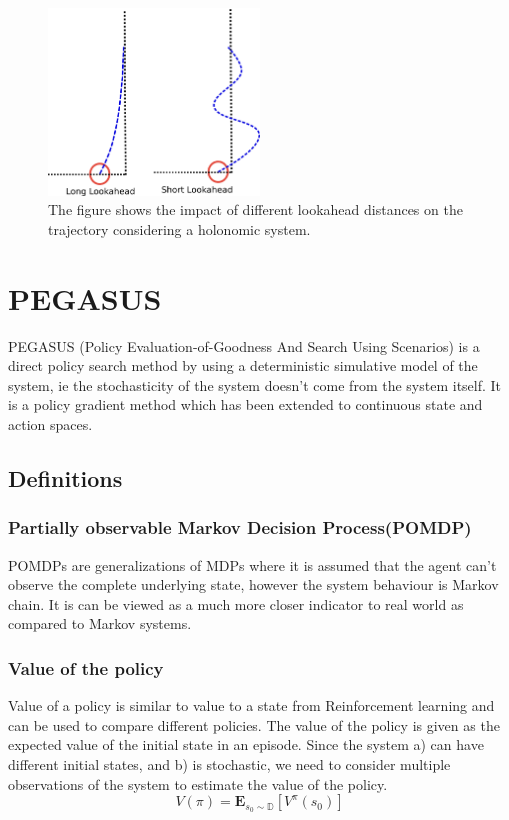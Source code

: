 \documentclass[hidelinks,BTech]{iitmdiss}
\begin{document}
\begin{figure}[H]
  \centering
    \includegraphics[width=0.5\textwidth]{Pure_Pursuit_path.png}
    \caption{The figure shows the impact of different lookahead distances on the trajectory considering a holonomic system.}
\end{figure}


\section{PEGASUS}
PEGASUS \cite{PEGASUS} (Policy Evaluation-of-Goodness And Search Using Scenarios) is a direct policy search method by using a deterministic simulative model of the system, ie the stochasticity of the system doesn't come from the system itself. It is a policy gradient method which has been extended to continuous state and action spaces.

\subsection*{Definitions}
\subsubsection{Partially observable Markov Decision Process(POMDP)}
POMDPs are generalizations of MDPs where it is assumed that the agent can't observe the complete underlying state, however the system behaviour is Markov chain. It is can be viewed as a much more closer indicator to real world as compared to Markov systems.

\subsubsection{Value of the policy}
Value of a policy is similar to value to a state from Reinforcement learning and can be used to compare different policies. The value of the policy is given as the expected value of the initial state in an episode. Since the system a) can have different initial states, and b) is stochastic, we need to consider multiple observations of the system to estimate the value of the policy.
\begin{equation}
  V(\pi) = \mathbf{E}_{s_{0} \sim \mathbb{D}} [ V^{\pi} (s_{0})]
\end{equation}
\end{document}
